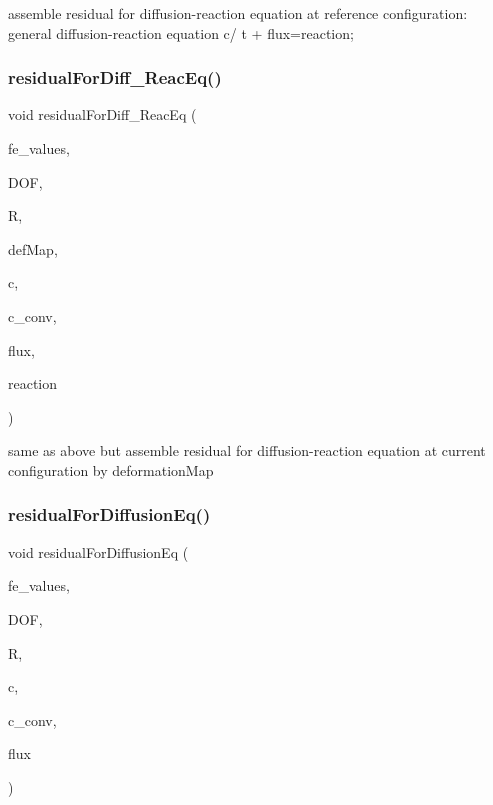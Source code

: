 assemble residual for diffusion-\/reaction equation at reference configuration\+: general diffusion-\/reaction equation  c/ t +  flux=reaction; \mbox{\label{class_residual_aa88dcdddfeefb2ba5f1f1196d8608b70}} 
\subsubsection{\texorpdfstring{residual\+For\+Diff\+\_\+\+Reac\+Eq()}{residualForDiff\_ReacEq()}\hspace{0.1cm}{\footnotesize\ttfamily [2/2]}}
{\footnotesize\ttfamily void residual\+For\+Diff\+\_\+\+Reac\+Eq (\begin{DoxyParamCaption}\item[{const F\+E\+Values$<$ dim $>$ \&}]{fe\+\_\+values,  }\item[{unsigned int}]{D\+OF,  }\item[{dealii\+::\+Table$<$ 1, T $>$ \&}]{R,  }\item[{\mbox{\hyperlink{structdeformation_map}{deformation\+Map}}$<$ T, dim $>$ \&}]{def\+Map,  }\item[{dealii\+::\+Table$<$ 1, T $>$ \&}]{c,  }\item[{dealii\+::\+Table$<$ 1, double $>$ \&}]{c\+\_\+conv,  }\item[{dealii\+::\+Table$<$ 2, T $>$ \&}]{flux,  }\item[{dealii\+::\+Table$<$ 1, T $>$ \&}]{reaction }\end{DoxyParamCaption})}

same as above but assemble residual for diffusion-\/reaction equation at current configuration by deformation\+Map \mbox{\label{class_residual_a224462af849f5a1927bc90eb3795f2f2}} 
\subsubsection{\texorpdfstring{residual\+For\+Diffusion\+Eq()}{residualForDiffusionEq()}\hspace{0.1cm}{\footnotesize\ttfamily [1/2]}}
{\footnotesize\ttfamily void residual\+For\+Diffusion\+Eq (\begin{DoxyParamCaption}\item[{const F\+E\+Values$<$ dim $>$ \&}]{fe\+\_\+values,  }\item[{unsigned int}]{D\+OF,  }\item[{dealii\+::\+Table$<$ 1, T $>$ \&}]{R,  }\item[{dealii\+::\+Table$<$ 1, T $>$ \&}]{c,  }\item[{dealii\+::\+Table$<$ 1, double $>$ \&}]{c\+\_\+conv,  }\item[{dealii\+::\+Table$<$ 2, T $>$ \&}]{flux }\end{DoxyParamCaption})}


